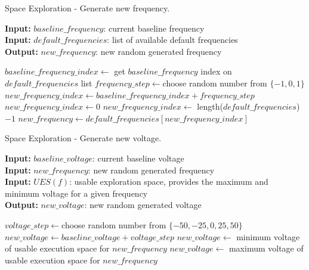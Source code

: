 \begin{algorithm}
    \caption{Space Exploration - Generate new frequency.}
    \label{alg:space-frequency}
 \hspace*{\algorithmicindent} \textbf{Input:} $baseline\_frequency$: current baseline frequency \\
 \hspace*{\algorithmicindent} \textbf{Input:} $default\_frequencies$: list of available default frequencies \\
 \hspace*{\algorithmicindent} \textbf{Output:} $new\_frequency$: new random generated frequency
\begin{algorithmic}
\STATE $baseline\_frequency\_index \leftarrow$ get $baseline\_frequency$ index on $default\_frequencies$ list
\STATE $frequency\_step \leftarrow $choose random number from $\{-1, 0, 1\}$
\STATE $new\_frequency\_index \leftarrow baseline\_frequency\_index + frequency\_step$
\STATE $new\_frequency\_index \leftarrow 0$
\STATE $new\_frequency\_index \leftarrow$ length($default\_frequencies$) $-1$
\ENDIF
\STATE $new\_frequency \leftarrow default\_frequencies[new\_frequency\_index]$
\end{algorithmic}
\end{algorithm}

\begin{algorithm}
\caption{Space Exploration - Generate new voltage.}
    \label{alg:space-voltage} 
    \hspace*{\algorithmicindent} \textbf{Input:} $baseline\_voltage$: current baseline voltage \\
 \hspace*{\algorithmicindent} \textbf{Input:} $new\_frequency$: new random generated frequency \\
 \hspace*{\algorithmicindent} \textbf{Input:} $UES(f)$: usable exploration space, provides the maximum and minimum voltage for a given frequency \\
 \hspace*{\algorithmicindent} \textbf{Output:} $new\_voltage$: new random generated voltage
\begin{algorithmic}
\STATE $voltage\_step \leftarrow $choose random number from $\{-50, -25,0, 25, 50\}$
\STATE $new\_voltage \leftarrow baseline\_voltage + voltage\_step$
\STATE $new\_voltage \leftarrow$ minimum voltage of usable execution space for $new\_frequency$
\STATE $new\_voltage \leftarrow$ maximum voltage of usable execution space for $new\_frequency$
\ENDIF
\end{algorithmic}
\end{algorithm}

